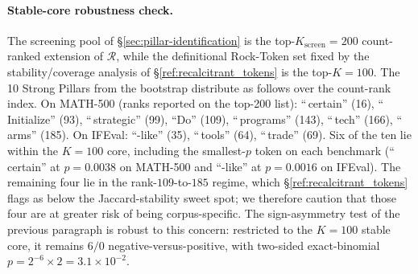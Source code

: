 \paragraph{Stable-core robustness check.} The screening pool of \S\ref{sec:pillar-identification} is the top-$K_{\text{screen}}=200$ count-ranked extension of $\mathcal{R}$, while the definitional Rock-Token set fixed by the stability/coverage analysis of \S\ref{ref:recalcitrant_tokens} is the top-$K=100$. The 10 Strong Pillars from the bootstrap distribute as follows over the count-rank index. On MATH-500 (ranks reported on the top-200 list): ``\,certain'' (16), ``\,Initialize'' (93), ``\,strategic'' (99), ``Do'' (109), ``\,programs'' (143), ``\,tech'' (166), ``\,arms'' (185). On IFEval: ``-like'' (35), ``\,tools'' (64), ``\,trade'' (69). Six of the ten lie within the $K=100$ core, including the smallest-$p$ token on each benchmark (``\,certain'' at $p=0.0038$ on MATH-500 and ``-like'' at $p=0.0016$ on IFEval). The remaining four lie in the rank-$109$-to-$185$ regime, which \S\ref{ref:recalcitrant_tokens} flags as below the Jaccard-stability sweet spot; we therefore caution that those four are at greater risk of being corpus-specific. The sign-asymmetry test of the previous paragraph is robust to this concern: restricted to the $K=100$ stable core, it remains $6/0$ negative-versus-positive, with two-sided exact-binomial $p = 2^{-6}\!\times\!2 = 3.1\times 10^{-2}$.
